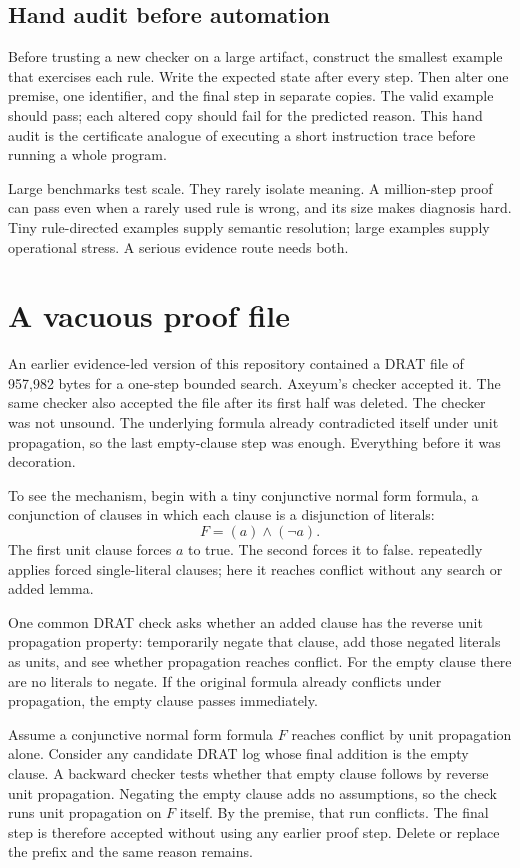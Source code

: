\subsection{Hand audit before automation}

Before trusting a new checker on a large artifact, construct the smallest
example that exercises each rule. Write the expected state after every step.
Then alter one premise, one identifier, and the final step in separate copies.
The valid example should pass; each altered copy should fail for the predicted
reason. This hand audit is the certificate analogue of executing a short
instruction trace before running a whole program.

Large benchmarks test scale. They rarely isolate meaning. A million-step proof
can pass even when a rarely used rule is wrong, and its size makes diagnosis
hard. Tiny rule-directed examples supply semantic resolution; large examples
supply operational stress. A serious evidence route needs both.

\section{A vacuous proof file}

An earlier evidence-led version of this repository contained a DRAT file of
957,982 bytes for a one-step bounded search. Axeyum's checker accepted it. The
same checker also accepted the file after its first half was deleted. The
checker was not unsound. The underlying formula already contradicted itself
under unit propagation, so the last empty-clause step was enough. Everything
before it was decoration.

To see the mechanism, begin with a tiny conjunctive normal form formula, a
conjunction of clauses in which each clause is a disjunction of literals:
\[
 F=(a)\land(\neg a).
\]
The first unit clause forces \(a\) to true. The second forces it to false.
 repeatedly applies forced single-literal clauses;
here it reaches conflict without any search or added lemma.

One common DRAT check asks whether an added clause has the reverse unit
propagation property: temporarily negate that clause, add those negated
literals as units, and see whether propagation reaches conflict. For the empty
clause there are no literals to negate. If the original formula already
conflicts under propagation, the empty clause passes immediately.

\begin{proofkit}[title={Reader argument: why the prefix is irrelevant}]
Assume a conjunctive normal form formula \(F\) reaches conflict by unit
propagation alone. Consider any candidate DRAT log whose final addition is the
empty clause. A backward checker tests whether that empty clause follows by
reverse unit propagation. Negating the empty clause adds no assumptions, so
the check runs unit propagation on \(F\) itself. By the premise, that run
conflicts. The final step is therefore accepted without using any earlier
proof step. Delete or replace the prefix and the same reason remains.
\end{proofkit}

